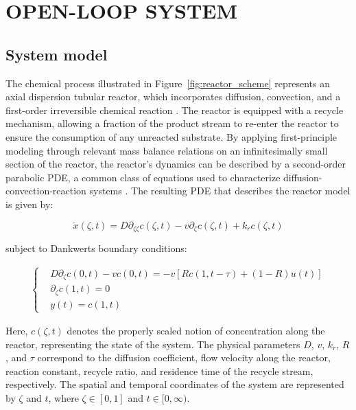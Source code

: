 \section{OPEN-LOOP SYSTEM}

\subsection{System model}

The chemical process illustrated in Figure~\ref{fig:reactor_scheme} represents an axial dispersion tubular reactor, which incorporates diffusion, convection, and a first-order irreversible chemical reaction \autocite{levenspiel1998chemical}. The reactor is equipped with a recycle mechanism, allowing a fraction of the product stream to re-enter the reactor to ensure the consumption of any unreacted substrate. By applying first-principle modeling through relevant mass balance relations on an infinitesimally small section of the reactor, the reactor's dynamics can be described by a second-order parabolic PDE, a common class of equations used to characterize diffusion-convection-reaction systems \autocite{jensen1982bifurcation}. The resulting PDE that describes the reactor model is given by:

\begin{equation} \label{eq:PDE_original_model}
    \dot{x}(\zeta, t) = D \partial_{\zeta \zeta} c(\zeta, t) - v \partial_\zeta c(\zeta, t) + k_r c(\zeta, t)
\end{equation}

subject to Dankwerts boundary conditions:

\begin{align} \label{eq:BC}
    \begin{cases}
        &D \partial_\zeta c(0, t) - v c(0, t) = -v \left[ R c(1, t-\tau) + (1-R) u(t) \right] \\
        &\partial_\zeta c(1, t) = 0 \\
        &y(t) = c(1, t)
    \end{cases}
\end{align}

Here, $c(\zeta, t)$ denotes the properly scaled notion of concentration along the reactor, representing the state of the system. The physical parameters $D$, $v$, $k_r$, $R$, and $\tau$ correspond to the diffusion coefficient, flow velocity along the reactor, reaction constant, recycle ratio, and residence time of the recycle stream, respectively. The spatial and temporal coordinates of the system are represented by $\zeta$ and $t$, where $\zeta \in [0, 1]$ and $t \in [0, \infty)$.

